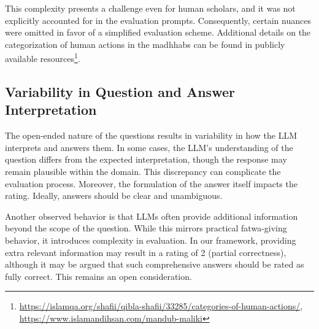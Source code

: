 \documentclass[letterpaper]{article}
\begin{document}
This complexity presents a challenge even for human scholars, and it was not explicitly accounted for in the evaluation prompts. Consequently, certain nuances were omitted in favor of a simplified evaluation scheme. Additional details on the categorization of human actions in the madhhabs can be found in publicly available resources\footnote{\url{https://islamqa.org/shafii/qibla-shafii/33285/categories-of-human-actions/}, \url{https://www.islamandihsan.com/mandub-maliki}}.

\subsection{Variability in Question and Answer Interpretation}

The open-ended nature of the questions results in variability in how the LLM interprets and answers them. In some cases, the LLM’s understanding of the question differs from the expected interpretation, though the response may remain plausible within the domain. This discrepancy can complicate the evaluation process. Moreover, the formulation of the answer itself impacts the rating. Ideally, answers should be clear and unambiguous. 


Another observed behavior is that LLMs often provide additional information beyond the scope of the question. While this mirrors practical fatwa-giving behavior, it introduces complexity in evaluation. In our framework, providing extra relevant information may result in a rating of 2 (partial correctness), although it may be argued that such comprehensive answers should be rated as fully correct. This remains an open consideration.


\end{document}
